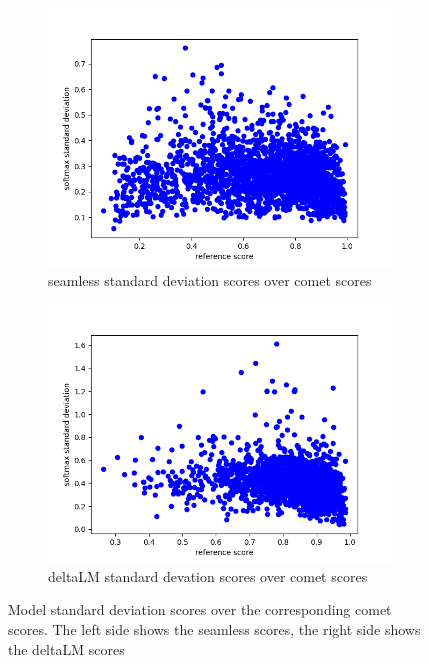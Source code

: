    \begin{figure}
            \centering%
            
    \begin{subfigure}{0.4\linewidth}
        \includegraphics[width=\textwidth]{Latex/sections/images/seamlessstddiv.png}
        \caption{seamless standard deviation scores over comet scores}
    \end{subfigure}
    \begin{subfigure}{0.4\linewidth}
        \includegraphics[width=\textwidth]{Latex/sections/images/dlmstddiv.png}
        \caption{deltaLM standard devation scores over comet scores}
    \end{subfigure}
    \caption{Model standard deviation scores over the corresponding comet scores. The left side shows the seamless scores, the right side shows the deltaLM scores}
    \label{fig:translationeval scatter plot stddiv}
\end{figure}

